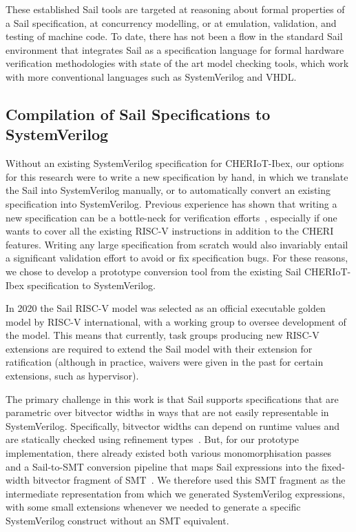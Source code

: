 \documentclass[10pt,conference]{IEEEtran}
\begin{document}
These established Sail tools are targeted at reasoning about formal properties
of a Sail specification, at concurrency modelling, or at emulation,
validation, and testing of machine code. To date, there has not been a flow
in the standard Sail environment that integrates Sail as a specification
language for formal hardware verification methodologies with state of the
art model checking tools, which work with more conventional languages such
as SystemVerilog and VHDL.

\subsection{Compilation of Sail Specifications to SystemVerilog}

Without an existing SystemVerilog specification for CHERIoT-Ibex,
our options for this research were to write a new
specification by hand, in which we translate the Sail into SystemVerilog
manually, or to automatically convert an existing specification into
SystemVerilog. Previous experience has shown that writing a new
specification can be a bottle-neck for verification
efforts~\cite{Gao:2021:EFV}, especially if one wants to cover all the
existing RISC-V instructions in addition to the CHERI features.  Writing
any large specification from scratch would also invariably entail a
significant validation effort to avoid or fix specification bugs. For these
reasons, we chose to develop a prototype conversion tool from the existing
Sail CHERIoT-Ibex specification to SystemVerilog.

In 2020 the Sail RISC-V model was selected as an official executable
golden model by RISC-V international, with a working group to oversee
development of the model. This means that currently, task groups
producing new RISC-V extensions are required to extend the Sail model
with their extension for ratification (although in practice, waivers
were given in the past for certain extensions, such as hypervisor).

The primary challenge in this work is that Sail supports specifications
that are parametric over bitvector widths in ways that are not easily
representable in SystemVerilog. Specifically, bitvector widths can depend
on runtime values and are statically checked using refinement
types~\cite{Vazou2013,Rondon2008}. But, for our prototype
implementation, there already existed both various monomorphisation
passes~\cite{Sail} and a Sail-to-SMT conversion pipeline that maps Sail
expressions into the fixed-width bitvector fragment of
SMT~\cite{sail-ifetch}. We therefore used this SMT fragment as the
intermediate representation from which we generated SystemVerilog
expressions, with some small extensions whenever we needed to generate
a specific SystemVerilog construct without an SMT equivalent.
\end{document}

